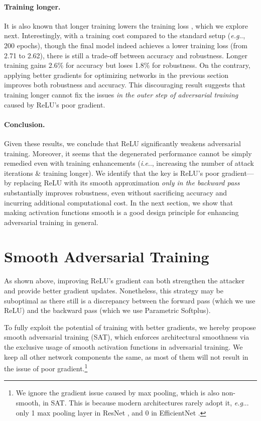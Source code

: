 \documentclass{article}
\makeatletter
\DeclareRobustCommand\onedot{\futurelet\@let@token\@onedot}
\def\@onedot{\ifx\@let@token.\else.\null\fi\xspace}
\def\eg{\emph{e.g}\onedot} \def\Eg{\emph{E.g}\onedot}
\def\ie{\emph{i.e}\onedot} \def\Ie{\emph{I.e}\onedot}
\makeatother
\begin{document}
\paragraph{Training longer.} It is also known that longer training lowers the training loss \cite{hoffer2017train}, which we explore next.
Interestingly, with a  training cost compared to the standard setup (\eg, 200 epochs), though the final model indeed achieves a lower training loss (from 2.71 to 2.62), there is still a trade-off between accuracy and robustness. Longer training gains 2.6\% for accuracy but loses 1.8\% for robustness. On the contrary, applying better gradients for optimizing networks in the previous section improves both robustness and accuracy. 
This discouraging result suggests that training longer cannot fix the issues  \emph{in the outer step of adversarial training} caused by ReLU's poor gradient. 

\paragraph{Conclusion.} Given these results, we conclude that ReLU significantly weakens adversarial training. Moreover, it seems that the degenerated performance cannot be simply remedied even with training enhancements (\ie, increasing the number of attack iterations \& training longer). We identify that the key is ReLU's poor gradient---by replacing ReLU with its smooth approximation \emph{only in the backward pass} substantially improves robustness, even without sacrificing accuracy and incurring additional computational cost. In the next section, we show that making activation functions smooth is a good design principle for enhancing adversarial training in general.


\section{Smooth Adversarial Training}
As shown above, improving ReLU's gradient can both strengthen the attacker and provide better gradient updates. Nonetheless, this strategy may be suboptimal as there still is a discrepancy between the forward pass (which we use ReLU) and the backward pass (which we use Parametric Softplus). 

To fully exploit the potential of training with better gradients, we hereby propose smooth adversarial training (SAT), which enforces architectural smoothness via the exclusive usage of smooth activation functions in adversarial training. We keep all other network components the same, as most of them will not result in the issue of poor gradient.\footnote{We ignore the gradient issue caused by max pooling, which is also non-smooth, in SAT. This is because modern architectures rarely adopt it, \eg. only 1 max pooling layer in ResNet \cite{He2016}, and 0 in EfficientNet \cite{Tan2019}.}
\end{document}
